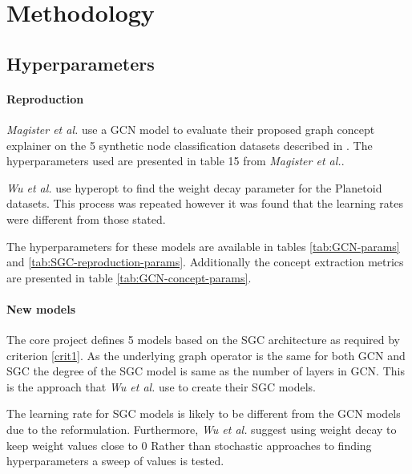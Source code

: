 \section{Methodology}

\subsection{Hyperparameters}
\label{sec:hyperparameters}

\paragraph{Reproduction}
\textit{Magister et al.}\cite{magister2021gcexplainer} use a GCN model to evaluate their proposed graph concept explainer on the 5 synthetic node classification datasets described in .
The hyperparameters used are presented in table 15 from \textit{Magister et al.}. 

\textit{Wu et al.}\cite{wu2019simplifying} use hyperopt to find the weight decay parameter for the Planetoid\cite{kipf2016semi} datasets.
This process was repeated however it was found that the learning rates were different from those stated.

The hyperparameters for these models are available in tables \ref{tab:GCN-params} and \ref{tab:SGC-reproduction-params}.
Additionally the concept extraction metrics are presented in table \ref{tab:GCN-concept-params}.

%
%
%

\paragraph{New models}
The core project defines 5 models based on the SGC architecture as required by criterion \ref{crit1}.
As the underlying graph operator is the same for both GCN and SGC the degree of the SGC model is same as the number of layers in GCN.
This is the approach that \textit{Wu et al.}\cite{wu2019simplifying} use to create their SGC models.

The learning rate for SGC models is likely to be different from the GCN models due to the reformulation.
Furthermore, \textit{Wu et al.}\cite{wu2019simplifying} suggest using weight decay to keep weight values close to $0$
Rather than stochastic approaches to finding hyperparameters a sweep of values is tested.

